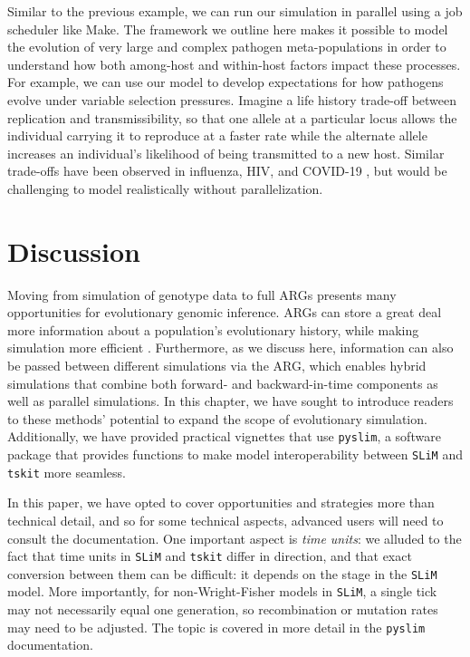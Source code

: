 \documentclass[12pt]{article}
\newcommand{\tskit}[0]{\texttt{tskit}\xspace}
\newcommand{\slim}[0]{\texttt{SLiM}\xspace}
\newcommand{\pyslim}[0]{\texttt{pyslim}\xspace}
\begin{document}
Similar to the previous example, we can run our simulation in parallel using a job scheduler like Make. %
The framework we outline here makes it possible to model the evolution of very large and complex pathogen meta-populations in order to understand how both among-host
and within-host factors impact these processes. 
For example, we can use our model to develop expectations for how pathogens evolve under variable selection pressures.
Imagine a life history trade-off between replication and transmissibility, so that one allele at a particular locus allows the
individual carrying it to reproduce at a faster rate while the alternate allele increases an individual's likelihood of being transmitted to a new host.
Similar trade-offs have been observed in influenza, HIV, and COVID-19 \citep{liang2023pathogenicity, arien2005replicative, zhu2022ancestral},
but would be challenging to model realistically without parallelization. 


\section{Discussion}

Moving from simulation of genotype data to full ARGs presents many opportunities for evolutionary genomic inference.
ARGs can store a great deal more information about a population's evolutionary history,
while making simulation more efficient \citep{kelleher_efficient_2018}.
Furthermore, as we discuss here, information can also be passed between different simulations via the ARG,
which enables hybrid simulations that combine both forward- and backward-in-time components as well as parallel simulations.
In this chapter, we have sought to introduce readers to these methods' potential to expand the scope of evolutionary simulation.
Additionally, we have provided practical vignettes that use \pyslim,
a software package that provides functions to make model interoperability between \slim and \tskit more seamless.

In this paper, we have opted to cover opportunities and strategies more than technical detail,
and so for some technical aspects, advanced users will need to consult the documentation.
One important aspect is \emph{time units}:
we alluded to the fact that time units in \slim and \tskit differ in direction,
and that exact conversion between them can be difficult:
it depends on the stage in the \slim model.
More importantly, for non-Wright-Fisher models in \slim, a single tick may not necessarily equal one generation,
so recombination or mutation rates may need to be adjusted.
The topic is covered in more detail in the \pyslim documentation.
\end{document}
